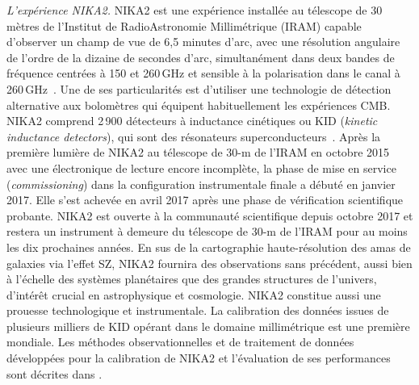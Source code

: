 \emph{L'expérience NIKA2.} NIKA2 est une expérience installée au
télescope de 30 mètres de l'Institut de RadioAstronomie Millimétrique
(IRAM) capable d'observer un champ de vue de 6,5 minutes d'arc, avec
une résolution angulaire de l'ordre de la dizaine de secondes d'arc,
simultanément dans deux bandes de fréquence centrées à 150 et
260\,GHz et sensible à la polarisation dans le canal à
260\,GHz~. Une de ses particularités est
d'utiliser une technologie de détection alternative aux bolomètres qui
équipent habituellement les expériences CMB. NIKA2 comprend 2\,900
détecteurs à inductance cinétiques ou KID (\emph{kinetic inductance
detectors}), qui sont des résonateurs
superconducteurs~. Après la première lumière de NIKA2 au
télescope de 30-m de l'IRAM en octobre 2015 avec une électronique de
lecture encore incomplète, la phase de mise en service
(\emph{commissioning}) dans la configuration instrumentale finale a
débuté en janvier 2017. Elle s'est achevée en avril 2017 après une
phase de vérification scientifique probante. NIKA2 est ouverte à la
communauté scientifique depuis octobre 2017 et restera un instrument à
demeure du télescope de 30-m de l'IRAM pour au moins les dix
prochaines années. En sus de la cartographie haute-résolution des amas
de galaxies via l'effet SZ, NIKA2 fournira des observations sans
précédent, aussi bien à l'échelle des systèmes planétaires que des
grandes structures de l'univers, d'intérêt crucial en astrophysique et
cosmologie. NIKA2 constitue aussi une prouesse technologique et
instrumentale. La calibration des données issues de plusieurs milliers
de KID opérant dans le domaine millimétrique est une première
mondiale. Les méthodes observationnelles et de traitement de données
développées pour la calibration de NIKA2 et l'évaluation de ses
performances sont décrites dans .\\


